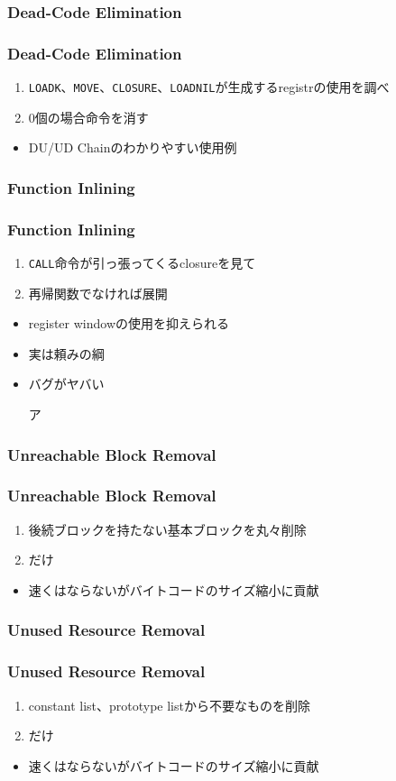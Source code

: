 \subsubsection{Dead-Code Elimination}
\begin{frame}[fragile]
	\frametitle{Dead-Code Elimination}
	\begin{enumerate}
		\item \lstinline{LOADK}、\lstinline{MOVE}、\lstinline{CLOSURE}、\lstinline{LOADNIL}が生成するregistrの使用を調べ
		\item 0個の場合命令を消す
	\end{enumerate}

	\pause
	\begin{itemize}
		\item DU/UD Chainのわかりやすい使用例
	\end{itemize}
\end{frame}
\subsubsection{Function Inlining}
\begin{frame}[fragile]
	\frametitle{Function Inlining}
	\begin{enumerate}
		\item \lstinline{CALL}命令が引っ張ってくるclosureを見て
		\item 再帰関数でなければ展開
	\end{enumerate}
	\pause
	\begin{itemize}
		\item register windowの使用を抑えられる
		\item<3-> \alert{実は頼みの綱}
		\item<4-> バグがヤバい

			ア
	\end{itemize}
\end{frame}
\subsubsection{Unreachable Block Removal}
\begin{frame}
	\frametitle{Unreachable Block Removal}
	\begin{enumerate}
		\item 後続ブロックを持たない基本ブロックを丸々削除
		\item だけ
	\end{enumerate}
	\begin{itemize}
		\item 速くはならないがバイトコードのサイズ縮小に貢献
	\end{itemize}
\end{frame}
\subsubsection{Unused Resource Removal}
\begin{frame}
	\frametitle{Unused Resource Removal}
	\begin{enumerate}
		\item constant list、prototype listから不要なものを削除
		\item だけ
	\end{enumerate}
	\begin{itemize}
		\item 速くはならないがバイトコードのサイズ縮小に貢献
	\end{itemize}
\end{frame}

